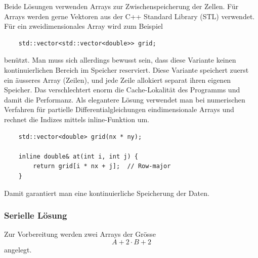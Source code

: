 Beide Lösungen verwenden Arrays zur Zwischenspeicherung der Zellen.
Für Arrays werden gerne Vektoren aus der C++ Standard Library (STL) verwendet.
Für ein zweidimensionales Array wird zum Beispiel
\begin{lstlisting}
	std::vector<std::vector<double>> grid;
\end{lstlisting}
benützt.
Man muss sich allerdings bewusst sein, dass diese Variante keinen kontinuierlichen Bereich im Speicher reserviert.
Diese Variante speichert zuerst ein äusseres Array (Zeilen), und jede Zeile allokiert separat ihren eigenen Speicher.
Das verschlechtert enorm die Cache-Lokalität des Programms und damit die Performanz.
%
%
Als elegantere Lösung verwendet man bei numerischen Verfahren für partielle Differentialgleichungen eindimensionale Arrays und rechnet die Indizes mittels inline-Funktion um.
\begin{lstlisting}
	std::vector<double> grid(nx * ny);
	
	inline double& at(int i, int j) {
		return grid[i * nx + j];  // Row-major
	}
\end{lstlisting}
Damit garantiert man eine kontinuierliche Speicherung der Daten.

\subsubsection{Serielle Lösung}
\label{parallelisierung:sub:serLoesung}
Zur Vorbereitung werden zwei Arrays der Grösse 
\begin{equation}
\label{parallelisierung:eq:Arrays}
A+2 \cdot B+2 
\end{equation}
angelegt. 


